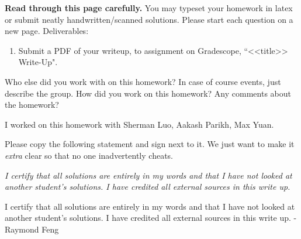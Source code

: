 \documentclass[11pt]{article}
\begin{document}
\fontsize{12}{15}\selectfont


\textbf{Read through this page carefully.} You may typeset your homework in latex or submit neatly handwritten/scanned solutions. Please start each question on a new page. Deliverables:

\begin{enumerate}
  \item Submit a PDF of your writeup, 
  to assignment on Gradescope, ``<<title>> Write-Up". 
\end{enumerate}


\begin{Parts}

\Part Who else did you work with on this homework? In case of course events, just describe the group. How did you work on this homework? Any comments about the homework?

\begin{tcolorbox}[breakable]
	I worked on this homework with Sherman Luo, Aakash Parikh, Max Yuan. 
\end{tcolorbox}

\Part Please copy the following statement and sign next to it. We just want to make it \textit{extra} clear so that no one inadvertently cheats.

\textit{I certify that all solutions are entirely in my words and that I have not looked at another student's solutions. I have credited all external sources in this write up.}

\begin{tcolorbox}[breakable]
	I certify that all solutions are entirely in my words and that I have not looked at another student's solutions. I have credited all external sources in this write up. -Raymond Feng
\end{tcolorbox}

\end{Parts}

\pagebreak
\end{document}
